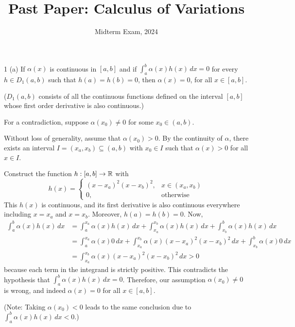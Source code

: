 \documentclass[11pt]{penrose}
\title{Past Paper: Calculus of Variations}
\subtitle{Midterm Exam, 2024}
\begin{document}
\maketitle
\warningtext

\begin{problem}{1 (a)}
    If $\alpha(x)$ is continuous in $[a,b]$ and if $\int_a^b \alpha(x) h(x) \,dx = 0$ for every $h \in D_{1}(a,b)$ such that $h(a) = h(b) = 0$, then $\alpha(x) = 0$, for all $x \in [a,b]$.

    ($D_{1}(a,b)$ consists of all the continuous functions defined on the interval $[a,b]$ whose first order derivative is also continuous.)

    \solution For a contradiction, suppose $\alpha(x_0) \neq 0$ for some $x_0 \in (a,b)$.

    Without loss of generality, assume that $\alpha(x_0) > 0$. By the continuity of $\alpha$, there exists an interval $I = (x_a, x_b) \subseteq (a,b)$ with $x_0 \in I$ such that $\alpha(x) > 0$ for all $x \in I$.

    Construct the function $h:[a,b] \to \mathbb{R}$ with
    \begin{equation*}
        h(x) =
        \begin{cases}
            (x - x_a)^2 (x - x_b)^2, & x \in (x_a, x_b) \\
            0, & \text{otherwise}
        \end{cases}
    \end{equation*}
    This $h(x)$ is continuous, and its first derivative is also continuous everywhere including $x = x_a$ and $x = x_b$. Moreover, $h(a) = h(b) = 0$. Now,
    \begin{align*}
        \int_a^b \alpha(x) h(x) \,dx
        &= \int_a^{x_a} \alpha(x) h(x) \,dx
        + \int_{x_a}^{x_b} \alpha(x) h(x) \,dx
        + \int_{x_b}^b \alpha(x) h(x) \,dx\\
        &= \int_a^{x_a} \alpha(x) 0 \,dx
        + \int_{x_a}^{x_b} \alpha(x) (x - x_a)^2 (x - x_b)^2 \,dx
        + \int_{x_b}^b \alpha(x) 0 \,dx\\
        &= \int_{x_a}^{x_b} \alpha(x) (x - x_a)^2 (x - x_b)^2 \,dx
        > 0
    \end{align*}
    because each term in the integrand is strictly positive. This contradicts the hypothesis that $\int_a^b \alpha(x) h(x) \,dx = 0$. Therefore, our assumption $\alpha(x_0) \neq 0$ is wrong, and indeed $\alpha(x) = 0$ for all $x \in [a,b]$.

    (Note: Taking $\alpha(x_0) < 0$ leads to the same conclusion due to $\int_a^b \alpha(x) h(x) \,dx < 0$.)
\end{problem}
\end{document}
